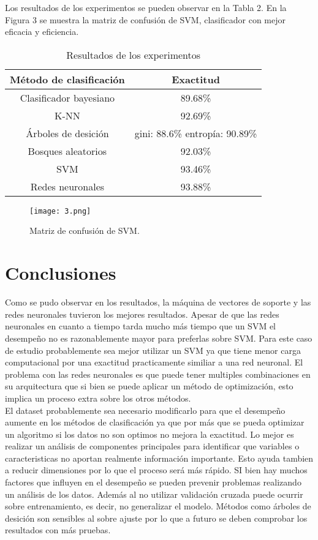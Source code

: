 \documentclass[conference]{IEEEtran}
\begin{document}
Los resultados de los experimentos se pueden observar en la Tabla 2. En la Figura 3 se muestra la matriz de confusión de SVM, clasificador con mejor eficacia y eficiencia. 

\begin{table}[H]
\begin{center}
\begin{tabular}{| c | c |}
\hline
Método de clasificación & Exactitud \\ \hline
Clasificador bayesiano  & 89.68\% \\ \hline
K-NN & 92.69\%\\ \hline
Árboles de desición & gini: 88.6\% entropía: 90.89\% \\ \hline
Bosques aleatorios & 92.03\% \\ \hline
SVM & 93.46\%  \\ \hline
Redes neuronales & 93.88\% \\ \hline
\end{tabular}
\caption{Resultados de los experimentos}
\end{center}
\end{table}

\begin{figure}[h]
    \centering
    \texttt{[image: 3.png]}
    \caption{Matriz de confusión de SVM.}
    \label{fig:mesh1}
\end{figure}

\section*{Conclusiones}
Como se pudo observar en los resultados, la máquina de vectores de soporte y las redes neuronales tuvieron los mejores resultados. Apesar de que las redes neuronales en cuanto a tiempo tarda mucho más tiempo que un SVM el desempeño no es razonablemente mayor para preferlas sobre SVM. Para este caso de estudio probablemente sea mejor utilizar un SVM ya que tiene menor carga computacional por una exactitud practicamente similiar a una red neuronal. El problema con las redes neuronales es que puede tener multiples combinaciones en su arquitectura que si bien se puede aplicar un método de optimización, esto implica un proceso extra sobre los otros métodos. \\

El dataset probablemente sea necesario modificarlo para que el desempeño aumente en los métodos de clasificación ya que por más que se pueda optimizar un algoritmo si los datos no son optimos no mejora la exactitud. Lo mejor es realizar un análisis de componentes principales para identificar que variables o caracteristicas no aportan realmente información importante. Esto ayuda tambien a reducir dimensiones por lo que el proceso será más rápido. SI bien hay muchos factores que influyen en el desempeño se pueden prevenir problemas realizando un análisis de los datos. Además al no utilizar validación cruzada puede ocurrir sobre entrenamiento, es decir, no generalizar el modelo. Métodos como árboles de desición son sensibles al sobre ajuste por lo que a futuro se deben comprobar los resultados con más pruebas. 
\end{document}
